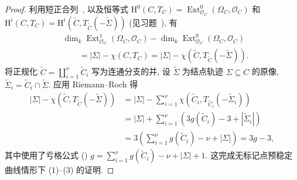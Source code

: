 \begin{proof}
利用短正合列~, 以及恒等式 $\mathrm H^0(C,\allowbreak T_C)=\operatorname{Ext}^0_{\mathcal O_C}(\Omega_C,\allowbreak \mathcal O_C)$ 和 $\mathrm H^i(C,\allowbreak T_C)=\mathrm H^i(\widetilde C,\allowbreak T_{\widetilde C}(-\widetilde\Sigma))$ (见习题~), 有
\[
\begin{aligned}
&\dim_k\operatorname{Ext}^1_{\mathcal O_C}(\Omega_C,\mathcal O_C)-\dim_k\operatorname{Ext}^0_{\mathcal O_C}(\Omega_C,\mathcal O_C)\\
&\qquad=|\Sigma|-\chi(C,T_C)=|\Sigma|-\chi(\widetilde C,T_{\widetilde C}(-\widetilde\Sigma)).
\end{aligned}
\]
将正规化 $\widetilde C=\coprod_{i=1}^{\nu}\widetilde C_i$ 写为连通分支的并, 设 $\widetilde\Sigma$ 为结点轨迹 $\Sigma\subseteq C$ 的原像, $\widetilde\Sigma_i=\widetilde C_i\cap\widetilde\Sigma$. 应用 Riemann--Roch 得
\[
\begin{aligned}
|\Sigma|-\chi(\widetilde C,T_{\widetilde C}(-\widetilde\Sigma))
&=|\Sigma|-\sum_{i=1}^{\nu}\chi(\widetilde C_i,T_{\widetilde C_i}(-\widetilde\Sigma_i))\\
&=|\Sigma|+\sum_{i=1}^{\nu}(3g(\widetilde C_i)-3+|\widetilde\Sigma_i|)\\
&=3\left(\sum_{i=1}^{\nu}g(\widetilde C_i)-\nu+|\Sigma|\right)=3g-3,
\end{aligned}
\]
其中使用了亏格公式 () $g=\sum_{i=1}^{\nu}g(\widetilde C_i)-\nu+|\Sigma|+1$. 这完成无标记点预稳定曲线情形下 (1)--(3) 的证明.


\end{proof}
